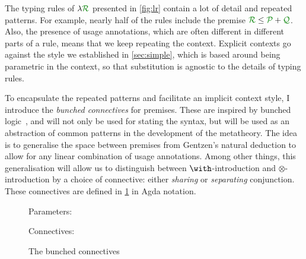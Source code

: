 The typing rules of $\name$ presented in \cref{fig:lr} contain a lot of detail
and repeated patterns.
For example, nearly half of the rules include the premise
$\grR \leq \grP + \grQ$.
Also, the presence of usage annotations, which are often different in different
parts of a rule, means that we keep repeating the context.
Explicit contexts go against the style we established in \cref{sec:simple},
which is based
around being parametric in the context, so that substitution is agnostic to the
details of typing rules.

To encapsulate the repeated patterns and facilitate an implicit context style,
I introduce the \emph{bunched connectives} for premises.
These are inspired by bunched logic~\citep{oHP99}, and will not only be used for
stating the syntax, but will be used as an abstraction of common patterns in the
development of the metatheory.
The idea is to generalise the space between premises from Gentzen's natural
deduction to allow for any linear combination of usage annotations.
Among other things, this generalisation will allow us to distinguish between
$\with$-introduction and $\otimes$-introduction by a choice of connective:
either \emph{sharing} or \emph{separating} conjunction.
These connectives are defined in \cref{fig:bunched} in Agda notation.

\begin{figure}
  Parameters:

  Connectives:
  \vspace{-1em}
  \begin{multicols}{2}
    \noindent{}
    \noindent{}
    \columnbreak
    \noindent{}
  \end{multicols}
  \vspace{-2em}
  \caption{The bunched connectives}
  \label{fig:bunched}
\end{figure}

